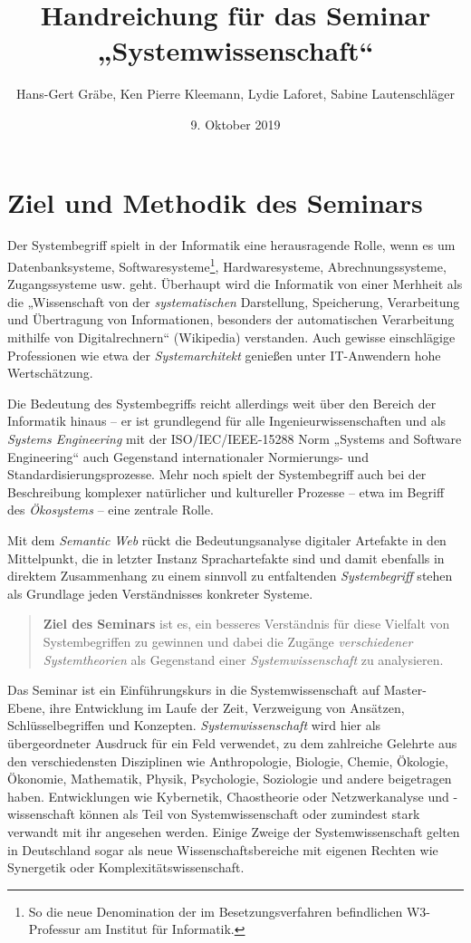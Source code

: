 \documentclass[11pt,a4paper]{article}
\title{Handreichung für das Seminar „Systemwissenschaft“}
\author{Hans-Gert Gr\"abe, Ken Pierre Kleemann, Lydie Laforet, Sabine
  Lautenschläger}
\date{9. Oktober 2019}
\begin{document}
\maketitle

\section{Ziel und Methodik des Seminars}

Der Systembegriff spielt in der Informatik eine herausragende Rolle, wenn es
um Datenbanksysteme, Softwaresysteme\footnote{So die neue Denomination der im
  Besetzungsverfahren befindlichen W3-Professur am Institut für Informatik.},
Hardwaresysteme, Abrechnungssysteme, Zugangssysteme usw. geht.  Überhaupt wird
die Informatik von einer Merhheit als die „Wissenschaft von der
\emph{systematischen} Darstellung, Speicherung, Verarbeitung und Übertragung
von Informationen, besonders der automatischen Verarbeitung mithilfe von
Digitalrechnern“ (Wikipedia) verstanden.  Auch gewisse einschlägige
Professionen wie etwa der \emph{Systemarchitekt} genießen unter IT-Anwendern
hohe Wertschätzung.

Die Bedeutung des Systembegriffs reicht allerdings weit über den Bereich der
Informatik hinaus -- er ist grundlegend für alle Ingenieurwissenschaften und
als \emph{Systems Engineering} mit der ISO/IEC/IEEE-15288 Norm „Systems and
Software Engineering“ auch Gegenstand internationaler Normierungs- und
Standardisierungsprozesse.  Mehr noch spielt der Systembegriff auch bei der
Beschreibung komplexer natürlicher und kultureller Prozesse -- etwa im Begriff
des \emph{Ökosystems} -- eine zentrale Rolle.

Mit dem \emph{Semantic Web} rückt die Bedeutungsanalyse digitaler Artefakte in
den Mittelpunkt, die in letzter Instanz Sprachartefakte sind und damit
ebenfalls in direktem Zusammenhang zu einem sinnvoll zu entfaltenden
\emph{Systembegriff} stehen als Grundlage jeden Verständnisses konkreter
Systeme.
\begin{quote}
  \textbf{Ziel des Seminars} ist es, ein besseres Verständnis für diese
  Vielfalt von Systembegriffen zu gewinnen und dabei die Zugänge
  \emph{verschiedener Systemtheorien} als Gegenstand einer
  \emph{Systemwissenschaft} zu analysieren.
\end{quote}
Das Seminar ist ein Einführungskurs in die Systemwissenschaft auf
Master-Ebene, ihre Entwicklung im Laufe der Zeit, Verzweigung von Ansätzen,
Schlüsselbegriffen und Konzepten.  \emph{Systemwissenschaft} wird hier als
übergeordneter Ausdruck für ein Feld verwendet, zu dem zahlreiche Gelehrte aus
den verschiedensten Disziplinen wie Anthropologie, Biologie, Chemie, Ökologie,
Ökonomie, Mathematik, Physik, Psychologie, Soziologie und andere beigetragen
haben. Entwicklungen wie Kybernetik, Chaostheorie oder Netzwerkanalyse und
-wissenschaft können als Teil von Systemwissenschaft oder zumindest stark
verwandt mit ihr angesehen werden.  Einige Zweige der Systemwissenschaft
gelten in Deutschland sogar als neue Wissenschaftsbereiche mit eigenen Rechten
wie Synergetik oder Komplexitätswissenschaft.
\end{document}
